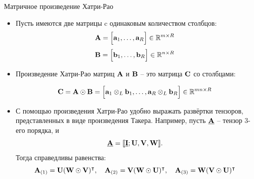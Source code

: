 \begin{frame}{Матричное произведение Хатри-Рао}


\begin{itemize}

    \item Пусть имеются две матрицы c одинаковым количеством столбцов:
    $$ \textbf{A} = \Big[ \textbf{a}_1, \dots, \textbf{a}_R \Big] \in \mathbb{R}^{m \times R}$$
    $$ \textbf{B} = \Big[ \textbf{b}_1, \dots, \textbf{b}_R \Big] \in \mathbb{R}^{n \times R}$$
    \item Произведение Хатри-Рао матриц $\textbf{A}$ и $\textbf{B}$ -- это матрица $\textbf{C}$ со столбцами:

    $$ \textbf{C} = \textbf{A} \odot \textbf{B} = \Big[ \textbf{a}_1 \otimes_L \textbf{b}_1, \dots,  \textbf{a}_R \otimes_L \textbf{b}_R \Big] \in \mathbb{R}^{mn \times R}$$
    \item С помощью произведения Хатри-Рао удобно выражать развёртки тензоров, представленных в виде произведения Такера. Например, пусть $\underline{\textbf{A}}$ -- тензор 3-его порядка, и 
    $$ \underline{\textbf{A}} = \llbracket \underline{\textbf{I}} ; \textbf{U}, \textbf{V},  \textbf{W} \rrbracket.$$
    Тогда справедливы равенства:
    $$ \textbf{A}_{(1)} = \textbf{U} (\textbf{W} \odot \textbf{V})^\intercal, \quad \textbf{A}_{(2)} = \textbf{V} (\textbf{W} \odot \textbf{U})^\intercal, \quad \textbf{A}_{(3)} = \textbf{W} (\textbf{V} \odot \textbf{U})^\intercal $$
\end{itemize}

\end{frame}
    
